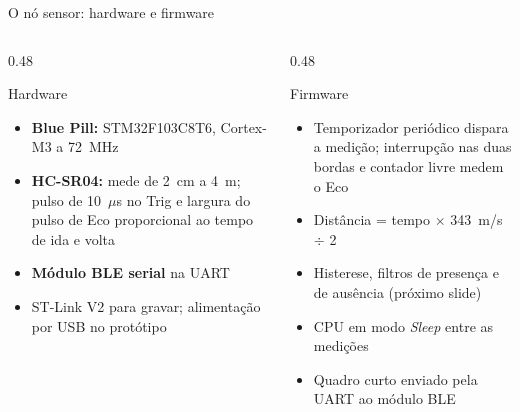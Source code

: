 \documentclass[aspectratio=169,11pt]{beamer}
\begin{document}
\begin{frame}[t]{O nó sensor: hardware e firmware}
  \begin{columns}[T]
    \begin{column}{0.48\textwidth}
      \begin{block}{Hardware}
        \footnotesize
        \begin{itemize}
          \item \textbf{Blue Pill:} STM32F103C8T6, Cortex-M3 a 72~MHz
          \item \textbf{HC-SR04:} mede de 2~cm a 4~m; pulso de 10~$\mu$s no Trig e largura do pulso de Eco proporcional ao tempo de ida e volta
          \item \textbf{Módulo BLE serial} na UART
          \item ST-Link V2 para gravar; alimentação por USB no protótipo
        \end{itemize}
      \end{block}
    \end{column}
    \begin{column}{0.48\textwidth}
      \begin{block}{Firmware}
        \footnotesize
        \begin{itemize}
          \item Temporizador periódico dispara a medição; interrupção nas duas bordas e contador livre medem o Eco
          \item Distância = tempo $\times$ 343~m/s $\div$ 2
          \item Histerese, filtros de presença e de ausência (próximo slide)
          \item CPU em modo \emph{Sleep} entre as medições
          \item Quadro curto enviado pela UART ao módulo BLE
        \end{itemize}
      \end{block}
    \end{column}
  \end{columns}
\end{frame}
\end{document}

